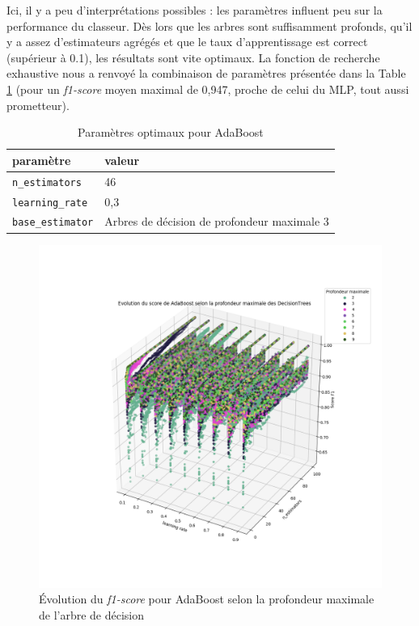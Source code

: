 \documentclass[a4paper]{report}
\begin{document}
Ici, il y a peu d'interprétations possibles : les paramètres influent peu sur la performance du classeur. Dès lors que les arbres sont suffisamment profonds, qu'il y a assez d'estimateurs agrégés et que le taux d'apprentissage est correct (supérieur à 0.1), les résultats sont vite optimaux. La fonction de recherche exhaustive nous a renvoyé la combinaison de paramètres présentée dans la Table \ref{best_params_ada} (pour un \emph{f1-score} moyen maximal de 0,947, proche de celui du MLP, tout aussi prometteur).

\begin{table}
\centering
\begin{tabular}{ll}
paramètre & valeur \\
\hline
\texttt{n\_estimators} & 46 \\
\texttt{learning\_rate} & 0,3 \\
\texttt{base\_estimator} & Arbres de décision de profondeur maximale 3\\
\end{tabular}
\caption{Paramètres optimaux pour AdaBoost\label{best_params_ada}}
\end{table}

\begin{figure}
\centering
\includegraphics[width=\textwidth]{img/adaboost_depth.png}
\caption{Évolution du \emph{f1-score} pour AdaBoost selon la profondeur maximale de l'arbre de décision\label{adaboost_depth}}
\end{figure}
\end{document}
